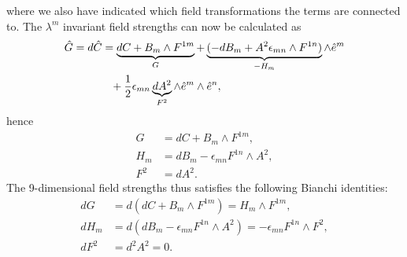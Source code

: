 where we also have indicated which field transformations the terms are connected to. The $\lambda^m$ invariant field strengths can now be calculated as
\begin{align}
\hat{G}=d\hat{C} &= \underbrace{dC + B_{m} \wedge F^{1m}}_{G} + \underbrace{(-dB_{m} + A^2 {\epsilon}_{mn} \wedge F^{1n})}_{-H_m} \wedge \hat{e}^m \nonumber \\
&\phantom{=}+ {1 \over 2}{\epsilon}_{mn} \underbrace{dA^2}_{F^2} \wedge \hat{e}^m \wedge \hat{e}^n,
\label{kalle1}
\end{align}
hence
\begin{align}
G&=dC + B_{m} \wedge F^{1m}, \nonumber \\
H_m&= dB_{m} - {\epsilon}_{mn} F^{1n} \wedge A^2, \nonumber \\
F^2&=dA^2.
\end{align}
The 9-dimensional field strengths thus satisfies the following Bianchi identities:
\begin{align}
dG&=d(dC + B_{m} \wedge F^{1m})=H_m \wedge F^{1m}, \nonumber \\
dH_m&=d(dB_m - {\epsilon}_{mn} F^{1n} \wedge A^2) = - {\epsilon}_{mn} F^{1n} \wedge F^{2},\nonumber \\
dF^2&=d^2 A^2 = 0.
\end{align}

